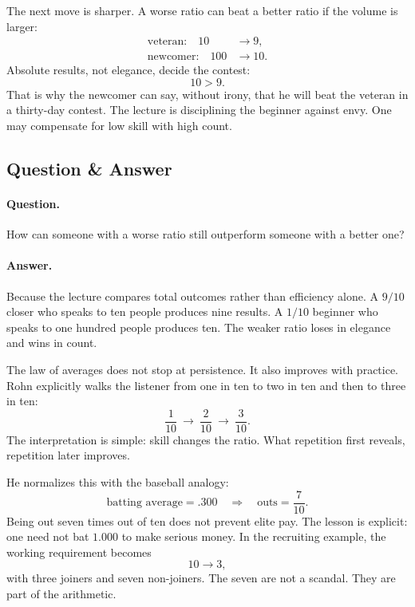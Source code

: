 The next move is sharper. A worse ratio can beat a better ratio if the volume is larger:
\begin{align}
\text{veteran:}\quad 10 &\to 9,\\
\text{newcomer:}\quad 100 &\to 10.
\end{align}
Absolute results, not elegance, decide the contest:
\begin{equation}
10 > 9.
\end{equation}
That is why the newcomer can say, without irony, that he will beat the veteran in a thirty-day contest. The lecture is disciplining the beginner against envy. One may compensate for low skill with high count.

\subsection{Question \& Answer}

\paragraph{Question.} How can someone with a worse ratio still outperform someone with a better one?

\paragraph{Answer.} Because the lecture compares total outcomes rather than efficiency alone. A \(9/10\) closer who speaks to ten people produces nine results. A \(1/10\) beginner who speaks to one hundred people produces ten. The weaker ratio loses in elegance and wins in count.

The law of averages does not stop at persistence. It also improves with practice. Rohn explicitly walks the listener from one in ten to two in ten and then to three in ten:
\begin{equation}
\frac{1}{10}\ \to\ \frac{2}{10}\ \to\ \frac{3}{10}.
\end{equation}
The interpretation is simple: skill changes the ratio. What repetition first reveals, repetition later improves.

He normalizes this with the baseball analogy:
\begin{equation}
\text{batting average}=.300
\quad\Longrightarrow\quad
\text{outs}=\frac{7}{10}.
\end{equation}
Being out seven times out of ten does not prevent elite pay. The lesson is explicit: one need not bat \(1.000\) to make serious money. In the recruiting example, the working requirement becomes
\begin{equation}
10 \to 3,
\end{equation}
with three joiners and seven non-joiners. The seven are not a scandal. They are part of the arithmetic.

